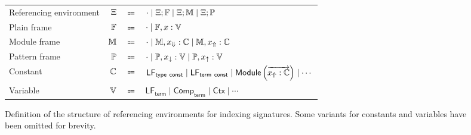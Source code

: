 \begin{figure}[htb]
\centering
\begin{tabular}{lrcl}
Referencing environment & $\Xi$ & $\Coloneqq$ & $\cdot \mid \Xi; \mathbb{F} \mid \Xi; \mathbb{M} \mid \Xi; \mathbb{P}$\\
Plain frame & $\mathbb{F}$ & $\Coloneqq$ & $\cdot \mid \mathbb{F}, x : \mathbb{V}$\\
Module frame & $\mathbb{M}$ & $\Coloneqq$ & $\cdot \mid \mathbb{M}, x_\Downarrow : \mathbb{C} \mid \mathbb{M}, x_\Uparrow : \mathbb{C}$\\
Pattern frame & $\mathbb{P}$ & $\Coloneqq$ & $\cdot \mid \mathbb{P}, x_\downarrow : \mathbb{V} \mid \mathbb{P}, x_\uparrow : \mathbb{V}$\\
Constant & $ \mathbb{C} $ & $ \Coloneqq $ & $\mathsf{LF}_{\mathsf{type\ const}} \mid \mathsf{LF}_{\mathsf{term\ const}} \mid \mathsf{Module}\left(\overrightarrow{x_\Uparrow : \mathbb{C}}\right) \mid \cdots$\\
Variable & $ \mathbb{V} $ & $ \Coloneqq $ & $ \mathsf{LF}_{\mathsf{term}} \mid \mathsf{Comp}_{\mathsf{term}} \mid \mathsf{Ctx} \mid \cdots $
\end{tabular}
\caption[Definition of referencing environments for indexing \Beluga signatures]{%
Definition of the structure of referencing environments for indexing \Beluga signatures.
Some variants for constants and variables have been omitted for brevity.
}
\label{figure:referencing-environment-definition}
\end{figure}

